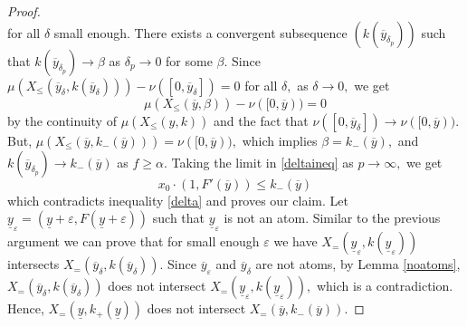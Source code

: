 \documentclass[12pt,reqno]{amsart}
\begin{document}
\begin{proof}
\begin{equation}
    \end{equation} for all $\delta$ small enough. There exists a convergent subsequence $(k(\overline{y}_{\delta_p}))$ such that $k(\overline{y}_{\delta_p})\to \beta$ as $\delta_p \rightarrow 0$ for some $\beta.$ Since $\mu(X_\le(\overline{y}_\delta,k(\overline{y}_\delta)))-\nu([0,\overline{y}_\delta])=0$ for all $\delta,$ as $\delta\to 0,$ we get \[\mu(X_\le(\overline{y},\beta))-\nu([0,\overline{y}))=0\] by the continuity of $\mu(X_\le(y,k))$ and the fact that $\nu([0,\overline{y}_\delta])\to \nu([0,\overline{y})).$ But, $\mu(X_\le(\overline{y},k_-(\overline{y})))=\nu([0,\overline{y})),$ which implies $\beta=k_-(\overline{y}),$ and $k(\overline{y}_{\delta_p})\to k_-(\overline{y})$ as $f\ge\alpha.$ Taking the limit in \eqref{deltaineq} as $p\to\infty,$ we get \[x_0\cdot (1,F'(\overline{y}))\le k_-(\overline{y})\] which  contradicts inequality \eqref{delta} and proves our claim. Let $\underline{y}_\varepsilon=(\underline{y}+\varepsilon,F(\underline{y}+\varepsilon))$ such that $\underline{y}_\varepsilon$ is not an atom. Similar to the previous argument we can prove that for small enough $\varepsilon$ we have $X_=(\underline{y}_\varepsilon,k(\underline{y}_\varepsilon))$ intersects $X_=(\overline{y}_\delta,k(\overline{y}_\delta)).$ Since $\overline{y}_\varepsilon$ and $\overline{y}_\delta$ are not atoms, by  Lemma \ref{noatoms}, $X_=(\overline{y}_\delta,k(\overline{y}_\delta))$ does not intersect $X_=(\underline{y}_\varepsilon,k(\underline{y}_\varepsilon)),$ which is a contradiction. Hence, $X_=(\underline{y},k_+(\underline{y}))$ does not intersect $X_=(\overline{y},k_-(\overline{y})).$ 

\end{proof}
\end{document}
